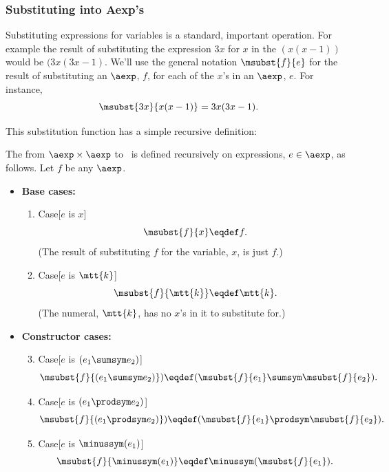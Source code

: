\begin{definition}
\subsubsection{Substituting into Aexp's}
Substituting expressions for variables is a standard, important
operation.  For example the result of substituting the expression $3x$ for $x$
in the $(x(x-1))$ would be $(3x(3x-1)$.  We'll use the general
notation $\msubst{f}{e}$ for the result of substituting an $\aexp$, $f$,
for each of the $x$'s in an $\aexp$, $e$.  For instance,
\[
\msubst{3x}{x(x-1)} = 3x(3x-1).
\]

This substitution function has a simple recursive definition:

\begin{definition}\label{subst-def}
  The  from $\aexp \times \aexp$ to \aexp\ is
  defined recursively on expressions, $e \in \aexp$, as follows.  Let $f$
  be any $\aexp$.

\begin{itemize}
\item \textbf{Base cases:}

\begin{enumerate}

\item\label{subst-var} Case[$e$ is $x$]
\[
\msubst{f}{x} \eqdef f.
\]
(The result of substituting $f$ for the variable, $x$, is just $f$.)

\item\label{subst-const} Case[$e$ is $\mtt{k}$]
\[
\msubst{f}{\mtt{k}} \eqdef \mtt{k}.
\]
(The numeral, $\mtt{k}$, has no $x$'s in it to substitute for.)

\end{enumerate}

\item \textbf{Constructor cases:}

\begin{enumerate}
\setcounter{enumi}{2}
\item\label{subst-sum} Case[$e$ is $(e_1 \sumsym e_2)$]
\[
\msubst{f}{(e_1 \sumsym e_2)}) \eqdef  (\msubst{f}{e_1} \sumsym
\msubst{f}{e_2}).
\]

\item\label{subst-prod} Case[$e$ is $(e_1 \prodsym e_2)$]
\[
\msubst{f}{(e_1 \prodsym e_2)}) \eqdef  (\msubst{f}{e_1} \prodsym
\msubst{f}{e_2}).
\]

\item\label{subst-minus} Case[$e$ is $\minussym(e_1)$]
\[
\msubst{f}{\minussym(e_1)} \eqdef \minussym (\msubst{f}{e_1}).
\]


\end{enumerate}
\end{itemize}
\end{definition}
\end{definition}
